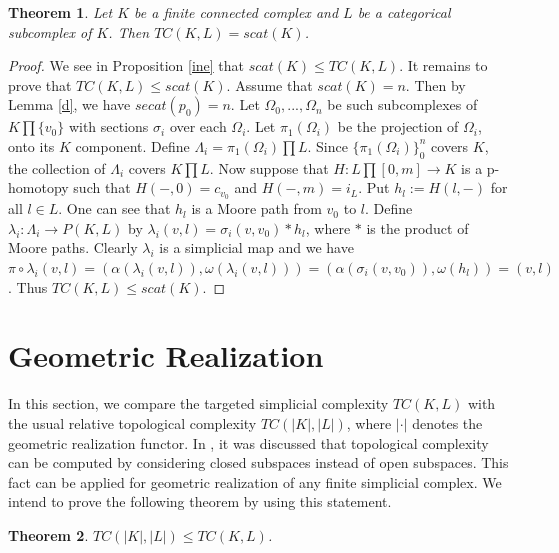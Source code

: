 \documentclass[preprint,11pt %
]{hjm1}
\newtheorem{theorem}{Theorem}[section]
\theoremstyle{definition}
\begin{document}
\begin{theorem}\label{intr}%
Let $K$ be a finite connected complex and $L$ be a categorical subcomplex of $K$. Then $TC(K,L)=scat(K)$.
\end{theorem}

\begin{proof}
We see in Proposition \ref{ine} that $scat(K)\leq TC(K,L)$. It  remains to prove that $TC(K,L)\leq scat(K)$. Assume that $scat(K)=n$. Then by Lemma \ref{d}, we have $secat(p_0)=n$. Let  $\Omega _0,...,\Omega_n$ be such subcomplexes of $K\prod \lbrace v_0\rbrace$ with sections $\sigma _i$ over each $\Omega _i$. Let $\pi _1(\Omega _i)$ be the projection of $\Omega _i$, onto its $K$ component. Define $\Lambda _i=\pi _1(\Omega _i)\prod L$. Since $\lbrace  \pi _1(\Omega _i)\rbrace _0 ^n$ covers $K$, the collection of $\Lambda _i$ covers $K \prod L$. Now suppose that $H:L\prod [0,m]\to K$ is a p-homotopy such that $H(-,0)=c_{v_0}$ and $H(-,m)=i_L$. Put $h_l:=H( l,-)$ for all $l\in L$. One can see that $h_l$ is a Moore path from $v_0$ to $l$. Define $\lambda _i:\Lambda _i\to P(K,L)$ by $\lambda _i(v,l)=\sigma _i(v,v_0)\ast h_l$, where $\ast $ is the product of Moore paths. Clearly $\lambda _i$ is a simplicial map and we have $\pi \circ \lambda _i (v,l)=(\alpha(\lambda _i(v,l)),\omega(\lambda _i(v,l)))=(\alpha(\sigma _i(v,v_0)),\omega(h_l))=(v,l)$. Thus $TC(K,L)\leq scat(K)$.
\end{proof}
  
\section{Geometric Realization}
In this section, we compare the targeted simplicial complexity \( TC(K, L) \) with the usual relative topological complexity \( TC(|K|, |L|) \), where \( |\cdot| \) denotes the geometric realization functor. In \cite{Inv}, it was discussed that topological complexity can be computed by considering closed subspaces instead of open subspaces. This fact can be applied for geometric realization of any finite simplicial complex. We intend to prove the following theorem by using this statement.


\begin{theorem}\label{e}
$TC(|K|,|L|)\leq TC(K,L)$.
\end{theorem}
\end{document}

